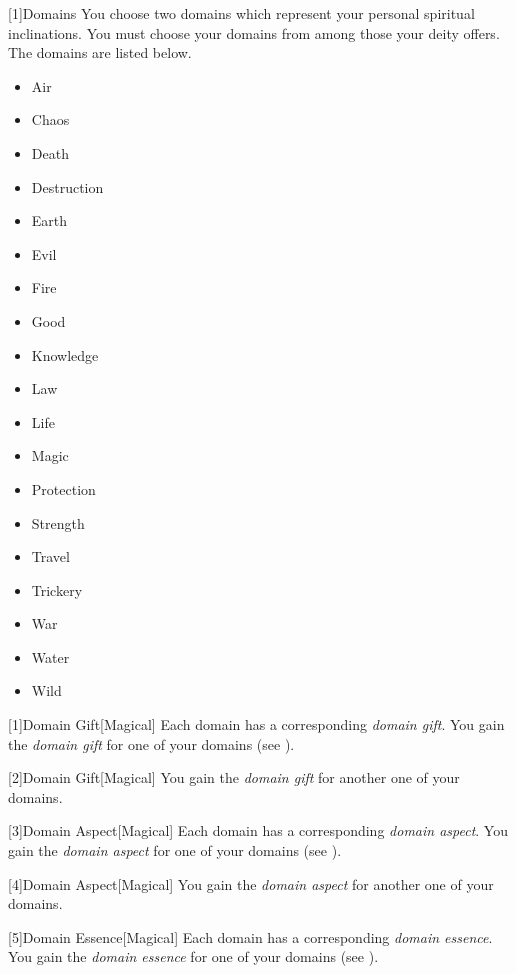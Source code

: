         [1]{Domains}
        You choose two domains which represent your personal spiritual inclinations.
        You must choose your domains from among those your deity offers.
        The domains are listed below.

        \begin{itemize}
            \item{Air}
            \item{Chaos}
            \item{Death}
            \item{Destruction}
            \item{Earth}
            \item{Evil}
            \item{Fire}
            \item{Good}
            \item{Knowledge}
            \item{Law}
            \item{Life}
            \item{Magic}
            \item{Protection}
            \item{Strength}
            \item{Travel}
            \item{Trickery}
            \item{War}
            \item{Water}
            \item{Wild}
        \end{itemize}

        [1]{Domain Gift}[Magical]
        Each domain has a corresponding \textit{domain gift}.
        You gain the \textit{domain gift} for one of your domains (see ).

        [2]{Domain Gift}[Magical]
        You gain the \textit{domain gift} for another one of your domains.

        [3]{Domain Aspect}[Magical]
        Each domain has a corresponding \textit{domain aspect}.
        You gain the \textit{domain aspect} for one of your domains (see ).

        [4]{Domain Aspect}[Magical]
        You gain the \textit{domain aspect} for another one of your domains.

        [5]{Domain Essence}[Magical]
        Each domain has a corresponding \textit{domain essence}.
        You gain the \textit{domain essence} for one of your domains (see ).

